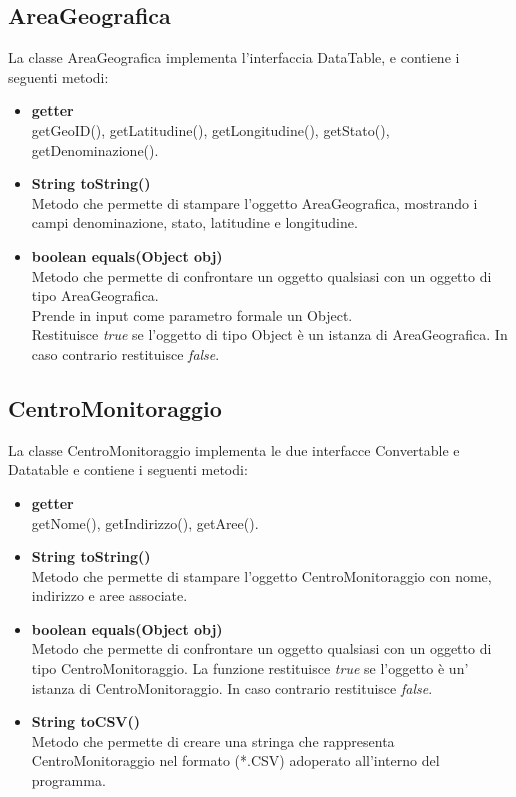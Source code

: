 \documentclass[a4paper, 12pt]{scrreprt}
\begin{document}
			\subsection{AreaGeografica}
			La classe AreaGeografica implementa l'interfaccia DataTable, e contiene i seguenti metodi:
				\begin{itemize}
				\item \textbf{getter}
				\\getGeoID(), getLatitudine(), getLongitudine(), getStato(), getDenominazione().
				
				\item \textbf{String toString()}
				\\Metodo che permette di stampare l'oggetto AreaGeografica, mostrando i campi denominazione, stato, latitudine e longitudine.
				
				\item \textbf{boolean equals(Object obj)}
				\\Metodo che permette di confrontare un oggetto qualsiasi con un oggetto di tipo AreaGeografica.
				\\Prende in input come parametro formale un Object.
				\\Restituisce \textit{true} se l'oggetto di tipo Object \`e un istanza di AreaGeografica. In caso contrario restituisce \textit{false}.
			\end{itemize}

			\subsection{CentroMonitoraggio}
			La classe CentroMonitoraggio implementa le due interfacce Convertable e Datatable e contiene i seguenti metodi:
			\begin{itemize}
				\item \textbf{getter}
				\\getNome(), getIndirizzo(), getAree().
				
				\item \textbf{String toString()}
				\\Metodo che permette di stampare l'oggetto CentroMonitoraggio con nome, indirizzo e aree associate.
				
				\item \textbf{boolean equals(Object obj)}
				\\Metodo che permette di confrontare un oggetto qualsiasi con un oggetto di tipo CentroMonitoraggio. La funzione restituisce \textit{true} se l'oggetto \`e un' istanza di CentroMonitoraggio. In caso contrario restituisce \textit{false}.
				
				\item \textbf{String toCSV()}
				\\Metodo che permette di creare una stringa che rappresenta CentroMonitoraggio nel formato (*.CSV) adoperato all'interno del programma.
			\end{itemize}
\end{document}
